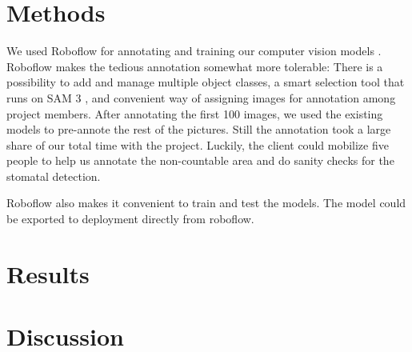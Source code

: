 \documentclass[a4paper,12pt,bibliography=totoc,numbers=noenddot,sfdefaults=false,abstract=true,notitlepage]{scrartcl} %
\begin{document}
	
	\section{Methods}\label{methods}

	We used Roboflow for annotating and training our computer vision models \autocite{dwyer2024roboflow}. Roboflow makes the tedious annotation somewhat more tolerable: There is a possibility to add and manage multiple object classes, a smart selection tool that runs on SAM 3 \autocite{carionSAM3Segment2025}, and convenient way of assigning images for annotation among project members. After annotating the first 100 images, we used the existing models to pre-annote the rest of the pictures. Still the annotation took a large share of our total time with the project. Luckily, the  client could mobilize five people to help us annotate the non-countable area and do sanity checks for the stomatal detection.

	Roboflow also makes it convenient to train and test the models. The model could be exported to deployment directly from roboflow.


	
	
	
	\section{Results}\label{results}



	
	
	
	\section{Discussion}\label{discussion}
\end{document}
